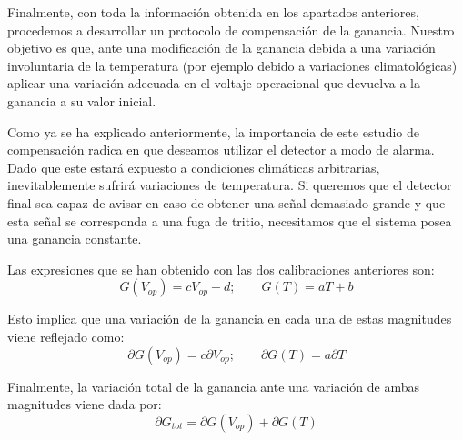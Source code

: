 Finalmente, con toda la información obtenida en los apartados anteriores, procedemos a desarrollar un protocolo de compensación de la ganancia. Nuestro objetivo es que, ante una modificación de la ganancia debida a una variación involuntaria de la temperatura (por ejemplo debido a variaciones climatológicas) aplicar una variación adecuada en el voltaje operacional que devuelva a la ganancia a su valor inicial.

Como ya se ha explicado anteriormente, la importancia de este estudio de compensación radica en que deseamos utilizar el detector  a modo de alarma. Dado que este estará expuesto a condiciones climáticas arbitrarias, inevitablemente sufrirá variaciones de temperatura. Si queremos que el detector final sea capaz de avisar en caso de obtener una señal demasiado grande y que esta señal se corresponda a una fuga de tritio, necesitamos que el sistema posea una ganancia constante.

Las expresiones que se han obtenido con las dos calibraciones anteriores son:
\begin{equation}
G(V_{op})=cV_{op}+d; \qquad G(T)=aT+b
\label{gananciatotal}
\end{equation}

Esto implica que una variación de la ganancia en cada una de estas magnitudes viene reflejado como:
\begin{equation}
\partial G(V_{op}) = c \partial V_{op}; \qquad \partial G(T) = a \partial T
\label{variacionparcialganancia}
\end{equation}

Finalmente, la variación total de la ganancia ante una variación de ambas magnitudes viene dada por:
\begin{equation}
\partial G_{tot} = \partial G(V_{op}) + \partial G(T)
\label{variaciontotalganancia}
\end{equation}

